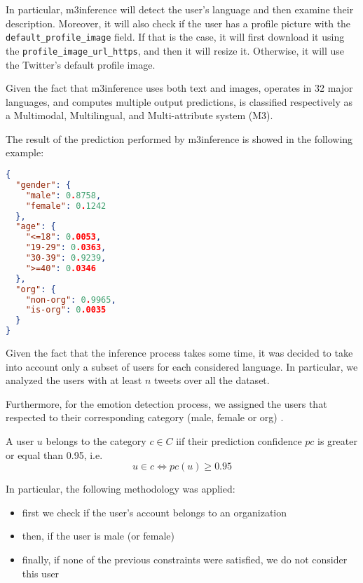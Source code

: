 In particular, m3inference will detect the user's language and then examine their description. Moreover, it will also check if the user has a profile picture with the \texttt{default\_profile\_image} field. If that is the case, it will first download it using the \texttt{profile\_image\_url\_https}, and then it will resize it. Otherwise, it will use the Twitter's default profile image. 

Given the fact that m3inference uses both text and images, operates in 32 major languages, and computes multiple output predictions, is classified respectively as a Multimodal, Multilingual, and Multi-attribute system (M3).

The result of the prediction performed by m3inference is showed in the following example:

\begin{lstlisting}[language=json, caption={Json object returned by m3inference}, captionpos=b, label={lst:m3inference-prediction}]
{
  "gender": {
    "male": 0.8758, 
    "female": 0.1242
  }, 
  "age": {
    "<=18": 0.0053, 
    "19-29": 0.0363, 
    "30-39": 0.9239, 
    ">=40": 0.0346
  }, 
  "org": {
    "non-org": 0.9965, 
    "is-org": 0.0035
  }
}
\end{lstlisting}

Given the fact that the inference process takes some time, it was decided to take into account only a subset of users for each considered language. In particular, we analyzed the users with at least \(n\) tweets over all the dataset. 

Furthermore, for the emotion detection process, we assigned the users that respected  to their corresponding category (male, female or org) .

\begin{definition}
\label{def:valid-users}
	A user \(u\) belongs to the category \(c \in C\) iif their prediction confidence \(pc\) is greater or equal than 0.95, i.e.
	\[u \in c \Longleftrightarrow pc(u) \geq 0.95\]
\end{definition}
	
In particular, the following methodology was applied:
	
\begin{itemize}
	\item first we check if the user's account belongs to an organization
	\item then, if the user is male (or female)
	\item finally, if none of the previous constraints were satisfied, we do not consider this user
\end{itemize}

